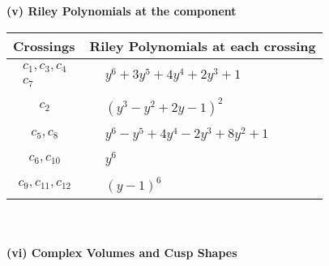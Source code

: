 \documentclass[1p]{elsarticle_modified}
\theoremstyle{definition}
\begin{document}
\newpage\renewcommand{\arraystretch}{1}
\flushleft \textbf{(v) Riley Polynomials at the component}\newline \\
\begin{tabular}{m{50pt}|m{274pt}}
Crossings & \hspace{64pt}Riley Polynomials at each crossing \\
\hline $$\begin{aligned}c_{1},c_{3},c_{4}\\c_{7}\end{aligned}$$&$\begin{aligned}
&y^6+3 y^5+4 y^4+2 y^3+1
\end{aligned}$\\
\hline $$\begin{aligned}c_{2}\end{aligned}$$&$\begin{aligned}
&(y^3- y^2+2 y-1)^2
\end{aligned}$\\
\hline $$\begin{aligned}c_{5},c_{8}\end{aligned}$$&$\begin{aligned}
&y^6- y^5+4 y^4-2 y^3+8 y^2+1
\end{aligned}$\\
\hline $$\begin{aligned}c_{6},c_{10}\end{aligned}$$&$\begin{aligned}
&y^6
\end{aligned}$\\
\hline $$\begin{aligned}c_{9},c_{11},c_{12}\end{aligned}$$&$\begin{aligned}
&(y-1)^6
\end{aligned}$\\
\hline
\end{tabular}\\~\\
\newpage\flushleft \textbf{(vi) Complex Volumes and Cusp Shapes}
\end{document}

